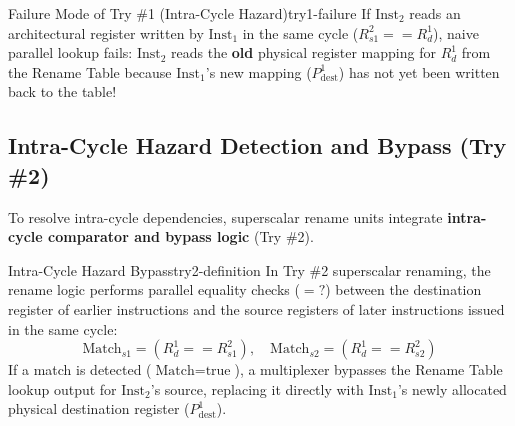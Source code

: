 \begin{observation}{Failure Mode of Try \#1 (Intra-Cycle  Hazard)}{try1-failure}
If $\text{Inst}_2$ reads an architectural register written by $\text{Inst}_1$ in the same cycle ($R_{s1}^2 == R_d^1$), naive parallel lookup fails: $\text{Inst}_2$ reads the \textbf{old} physical register mapping for $R_d^1$ from the Rename Table because $\text{Inst}_1$'s new mapping ($P_{\text{dest}}^1$) has not yet been written back to the table!
\end{observation}

\subsection{Intra-Cycle  Hazard Detection and Bypass (Try \#2)}

To resolve intra-cycle dependencies, superscalar rename units integrate \textbf{intra-cycle comparator and bypass logic} (Try \#2).

\begin{definition}{Intra-Cycle  Hazard Bypass}{try2-definition}
In Try \#2 superscalar renaming, the rename logic performs parallel equality checks ($=?$) between the destination register of earlier instructions and the source registers of later instructions issued in the same cycle:
\begin{equation}
\text{Match}_{s1} = (R_d^1 == R_{s1}^2), \quad \text{Match}_{s2} = (R_d^1 == R_{s2}^2)
\end{equation}
If a match is detected ($\text{Match} = \text{true}$), a multiplexer bypasses the Rename Table lookup output for $\text{Inst}_2$'s source, replacing it directly with $\text{Inst}_1$'s newly allocated physical destination register ($P_{\text{dest}}^1$).
\end{definition}


